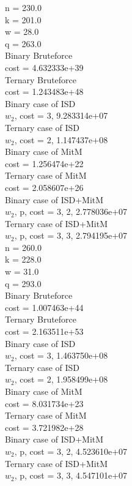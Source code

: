\documentclass[12pt]{article}
\begin{document}
n = 230.0 \\
k = 201.0 \\
w = 28.0 \\
q = 263.0 \\
Binary Bruteforce \\
cost = 4.632333e+39 \\
Ternary Bruteforce \\
cost = 1.243483e+48 \\
Binary case of ISD \\
$w_2$, cost = 3, 9.283314e+07 \\
Ternary case of ISD \\
$w_2$, cost = 2, 1.147437e+08 \\
Binary case of MitM \\
cost = 1.256474e+22 \\
Ternary case of MitM \\
cost = 2.058607e+26 \\
Binary case of ISD+MitM \\
$w_2$, p, cost = 3, 2, 2.778036e+07 \\
Ternary case of ISD+MitM \\
$w_2$, p, cost = 3, 3, 2.794195e+07 \\

n = 260.0 \\
k = 228.0 \\
w = 31.0 \\
q = 293.0 \\
Binary Bruteforce \\
cost = 1.007463e+44 \\
Ternary Bruteforce \\
cost = 2.163511e+53 \\
Binary case of ISD \\
$w_2$, cost = 3, 1.463750e+08 \\
Ternary case of ISD \\
$w_2$, cost = 2, 1.958499e+08 \\
Binary case of MitM \\
cost = 8.031734e+23 \\
Ternary case of MitM \\
cost = 3.721982e+28 \\
Binary case of ISD+MitM \\
$w_2$, p, cost = 3, 2, 4.523610e+07 \\
Ternary case of ISD+MitM \\
$w_2$, p, cost = 3, 3, 4.547101e+07 \\
\end{document}
